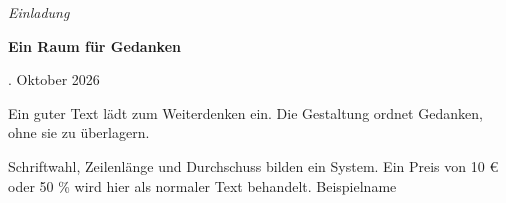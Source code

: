\documentclass[12pt,a4paper,ngerman,DIV=12,BCOR=0mm,oneside]{scrartcl}
\newcommand{\datenschrift}{\sffamily\small\firalining\firatabular}
\begin{document}
\begin{center}
{\normalsize\itshape Einladung\par}
\bigskip
{\LARGE\bfseries Ein Raum für Gedanken\par}
\bigskip
{\datenschrift 19. Oktober 2026}
\end{center}
\bigskip
Ein guter Text lädt zum Weiterdenken ein. Die Gestaltung ordnet Gedanken, ohne sie zu überlagern.

Schriftwahl, Zeilenlänge und Durchschuss bilden ein System. Ein Preis von 10 € oder 50 \% wird hier als normaler Text behandelt.
\bigskip
Beispielname
\end{document}

